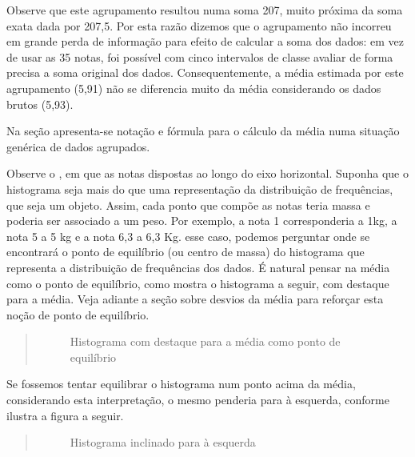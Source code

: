 Observe que este agrupamento resultou numa soma 207, muito próxima da soma exata dada por 207,5. Por esta razão dizemos que o agrupamento não incorreu em grande perda de informação para efeito de calcular a soma dos dados: em vez de usar as 35 notas, foi possível com cinco intervalos de classe avaliar de forma precisa a soma original dos dados. Consequentemente, a média estimada por este agrupamento (5,91) não se diferencia muito da média considerando os dados brutos (5,93).

Na seção {\hyperref[\detokenize{PE104-A:sec-para-saber-mais}]{}} apresenta-se notação e fórmula para o cálculo da média numa situação genérica de dados agrupados.


Observe o {\hyperref[\detokenize{PE104-0:fig-histograma-notas-sem-bonificacao}]{}} , em que as notas dispostas ao longo do eixo horizontal. Suponha que o histograma seja mais do que uma representação da distribuição de frequências, que seja um objeto. Assim, cada ponto que compõe as notas teria massa e poderia ser associado a um peso.  Por exemplo, a nota 1 corresponderia a 1kg, a nota 5 a 5 kg e a nota 6,3 a 6,3 Kg.  esse caso, podemos perguntar onde se encontrará o ponto de equilíbrio (ou centro de massa) do histograma que representa a distribuição de frequências dos dados. É natural pensar na média como o ponto de equilíbrio, como mostra o histograma a seguir, com destaque para a média. Veja adiante a seção sobre desvios da média para reforçar esta noção de ponto de equilíbrio.
\label{\detokenize{PE104-1:id1}}\begin{quote}

\begin{figure}[H]
\centering
\capstart

\noindent{}
\caption{Histograma com destaque para a média como ponto de equilíbrio}\label{\detokenize{PE104-1:id8}}\end{figure}
\end{quote}

Se fossemos tentar equilibrar o histograma num ponto acima da média, considerando esta interpretação, o mesmo penderia para à esquerda, conforme ilustra a figura a seguir.
\begin{quote}

\begin{figure}[H]
\centering
\capstart

\noindent{}
\caption{Histograma inclinado para à esquerda}\label{\detokenize{PE104-1:id2}}\label{\detokenize{PE104-1:id9}}\end{figure}
\end{quote}

